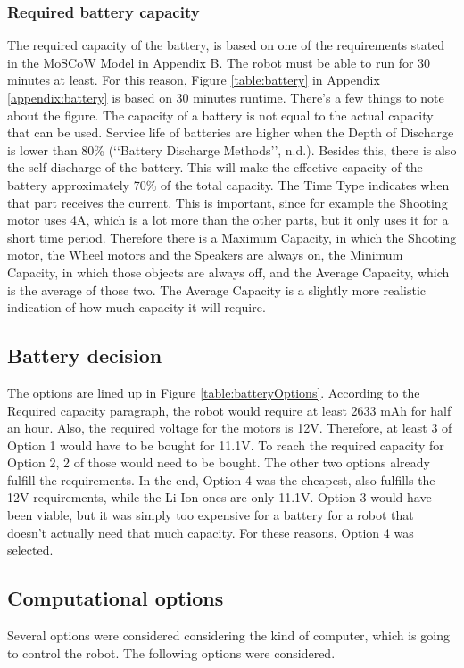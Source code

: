 \documentclass[11pt,twoside,a4paper]{report}
\begin{document}
\subsubsection{Required battery capacity}
The required capacity of the battery, is based on one of the requirements stated in the MoSCoW Model in Appendix B. The robot must be able to run for 30 minutes at least. For this reason, Figure \ref{table:battery} in Appendix \ref{appendix:battery} is based on 30 minutes runtime. 
There\rq{}s a few things to note about the figure. The capacity of a battery is not equal to the actual capacity that can be used. Service life of batteries are higher when the Depth of Discharge is lower than 80\% (\lq\lq{}Battery Discharge Methods\rq\rq{}, n.d.). Besides this, there is also the self-discharge of the battery. This will make the effective capacity of the battery approximately 70\% of the total capacity. 
The Time Type indicates when that part receives the current. This is important, since for example the Shooting motor uses 4A, which is a lot more than the other parts, but it only uses it for a short time period. Therefore there is a Maximum Capacity, in which the Shooting motor, the Wheel motors and the Speakers are always on, the Minimum Capacity, in which those objects are always off, and the Average Capacity, which is the average of those two. The Average Capacity is a slightly more realistic indication of how much capacity it will require. 

\subsection{Battery decision}
The options are lined up in Figure \ref{table:batteryOptions}. According to the Required capacity paragraph, the robot would require at least 2633 mAh for half an hour. Also, the required voltage for the motors is 12V. Therefore, at least 3 of Option 1 would have to be bought for 11.1V. To reach the required capacity for Option 2, 2 of those would need to be bought. The other two options already fulfill the requirements. 
In the end, Option 4 was the cheapest, also fulfills the 12V requirements, while the Li-Ion ones are only 11.1V. Option 3 would have been viable, but it was simply too expensive for a battery for a robot that doesn\rq{}t actually need that much capacity. 
For these reasons, Option 4 was selected. 

\subsection{Computational options}
Several options were considered considering the kind of computer, which is going to control the robot. The following options were considered. 
\end{document}
